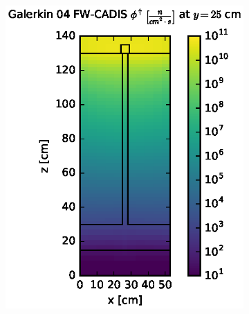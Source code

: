 \begin{figure}[!htb]
\begin{subfigure}{0.4\textwidth}
\includegraphics[max height=0.445\textheight]
{img/steel-plots/fwc-adj/flux-gkn04-slice.eps}
\end{subfigure}
\\
\begin{subfigure}{0.4\textwidth}

\end{subfigure}
\end{figure}
